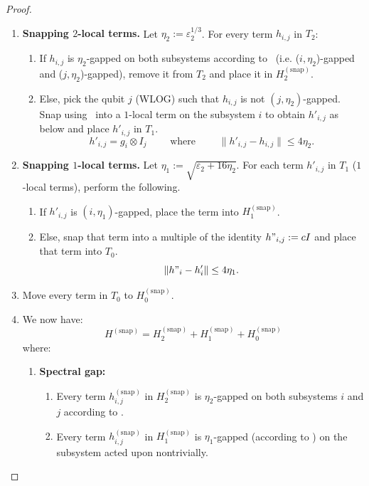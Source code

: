 \documentclass[a4paper,onecolumn,11pt]{quantumarticle}
\theoremstyle{plain}
\newcommand{\eps}{\varepsilon}
\newcommand{\snp}{{(\mathrm{snap})}}
\begin{document}
\begin{proof}
\begin{enumerate}
    Let $\eps_2 = \eps$.
    \item \textbf{Snapping $2$-local terms.} Let $\eta_2 := \eps_2^{1/3}$. For every term $h_{i, j}$ in $T_2$:
    \begin{enumerate}
        \item If $h_{i, j}$ is $\eta_2$-gapped on both subsystems according to~ (i.e. ($i, \eta_2$)-gapped and ($j, \eta_2$)-gapped), remove it from $T_2$ and place it in $H^\snp_2$.
        \item Else, pick the qubit $j$ (WLOG) such that $h_{i, j}$ is not $(j, \eta_2)$-gapped. Snap using~ into a $1$-local term on the subsystem $i$ to obtain $h'_{i,j}$ as below and place $h'_{i,j}$ in $T_1$.
        \begin{equation}
        h'_{i,j} = g_i \otimes I_j  \quad\quad \text{ where }\quad\quad     \| h'_{i,j} - h_{i,j} \| \leq 4\eta_2.
        \end{equation}
    \end{enumerate}
    \item \textbf{Snapping $1$-local terms.} Let $\eta_1 := \sqrt{\eps_2 + 16\eta_2}$. For each term $h'_{i,j}$ in $T_1$ ($1$-local terms), perform the following.
    \begin{enumerate}
        \item If $h'_{i,j}$ is $(i, \eta_1)$-gapped, place the term into $H^\snp_1$.
        \item Else, snap that term into a multiple of the identity $h"_{i,j} := c I$ and place that term into $T_0$.
        \begin{equation}
            \|h"_i - h'_i\| \leq 4 \eta_1.
        \end{equation}
    \end{enumerate}
    \item Move every term in $T_0$ to $H^\snp_0$.
    \item We now have:
    \begin{equation}
        H^\snp = H^\snp_2 + H^\snp_1 + H^\snp_0
    \end{equation}
    where:
    \begin{enumerate}
    \item \textbf{Spectral gap:}
    \begin{enumerate}
        \item Every term $h_{i,j}^\snp$ in $H^\snp_2$ is $\eta_2$-gapped on both subsystems $i$ and $j$ according to .
        \item Every term $h_{i,j}^\snp$ in $H^\snp_1$ is $\eta_1$-gapped (according to ) on the subsystem acted upon nontrivially.

\end{enumerate}
\end{enumerate}
\end{enumerate}
\end{proof}
\end{document}
